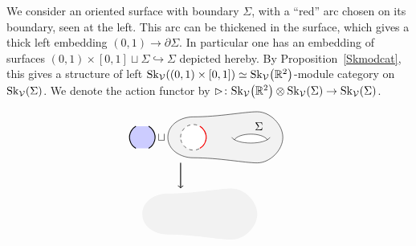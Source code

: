 \documentclass[pdftex]{sigma}%
\numberwithin{equation}{section}
\begin{document}
\begin{Definition}\label{defLeftActSkR2}
We consider an oriented surface with boundary $\Sigma$, with a ``red'' arc chosen on its boundary, seen at the left. This arc can be thickened in the surface, which gives a thick left embedding $(0,1) \to\partial \Sigma$. In particular one has an embedding of surfaces $(0,1)\times[0,1]\sqcup\Sigma \hookrightarrow \Sigma$ depicted hereby. By Proposition~\ref{Skmodcat}, this gives a structure of left ${\rm Sk}_\mathcal{V}((0,1)\times[0,1]) \simeq {\rm Sk}_\mathcal{V}\big(\mathbb{R}^2\big)$-module category on~${\rm Sk}_\mathcal{V}(\Sigma)$. We denote the action functor by \mbox{$\rhd\colon{\rm Sk}_\mathcal{V}\big(\mathbb{R}^2\big) \otimes {\rm Sk}_\mathcal{V}(\Sigma) \to {\rm Sk}_\mathcal{V}(\Sigma)$}.
\end{Definition}
$$
\begin{tikzpicture}[yscale = 0.8, xscale = -0.8]
\fill[gray!10] (4.5,1) .. controls (4.5,0.5) and (4,0.2) .. (3.5,0.2)	.. controls (2.5,0.2) and (1.5,0 ) .. (1,0)	.. controls (0.5,0 ) and (0,0.5 ) .. (0,1)	.. controls (0,1.5 ) and (0.5,2 ) .. (1,2)	.. controls (1.5,2 ) and (2.5,1.8) .. (3.5,1.8) .. controls (4,1.8) and (4.5,1.5) .. (4.5,1) -- cycle ;
\fill[white] (0.6,0.9) .. controls (0.7,0.7) and (1.8,0.7) .. (1.9,0.9) .. controls (1.7,1.2) and (0.8,1.2) .. (0.6,0.9);
\fill[white] (3.5,1) circle(0.5);
\draw[dashed] (3.5,1) circle(0.5);
\draw[thick, red] (240:0.5)++(3.5,1) arc(240:120:0.5);
\draw (0.5,1) .. controls (0.7,0.7) and (1.8,0.7) .. (2,1);
\draw (0.6,0.9) .. controls (0.8,1.2) and (1.7,1.2) .. (1.9,0.9) node[midway, above right]{$\Sigma$};
\draw (4.5,1) .. controls (4.5,0.5) and (4,0.2) .. (3.5,0.2)	.. controls (2.5,0.2) and (1.5,0 ) .. (1,0)	.. controls (0.5,0 ) and (0,0.5 ) .. (0,1)	.. controls (0,1.5 ) and (0.5,2 ) .. (1,2)	.. controls (1.5,2 ) and (2.5,1.8) .. (3.5,1.8) .. controls (4,1.8) and (4.5,1.5) .. (4.5,1);
\node (sq) at (4.75,1){$\sqcup$}; \draw[->, thick] (4,0) -- ++(0,-1) node[midway, right]{};
\fill[blue!20](240:0.5)++(5.5,1) arc(240:120:0.5) -- ++(0.5,0) arc(60:-60:0.5) -- ++(-0.5,0);
\draw[thick] (240:0.5)++(5.5,1) arc(240:120:0.5);
\draw[thick] (-60:0.5)++(5.5,1) arc(-60:60:0.5);
\begin{scope}[yshift = -3cm, xshift = 1cm]
\fill[gray!10] (4.5,1) .. controls (4.5,0.5) and (4,0.2) .. (3.5,0.2)	.. controls (2.5,0.2) and (1.5,0 ) .. (1,0)	.. controls (0.5,0 ) and (0,0.5 ) .. (0,1)	.. controls (0,1.5 ) and (0.5,2 ) .. (1,2)	.. controls (1.5,2 ) and (2.5,1.8) .. (3.5,1.8) .. controls (4,1.8) and (4.5,1.5) .. (4.5,1) -- cycle ;

\end{scope}
\end{tikzpicture}$$
\end{document}
